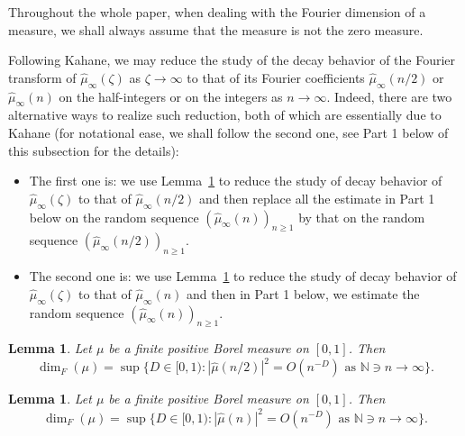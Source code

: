 \documentclass[12pt]{amsart}
\newtheorem{lemma}[theorem]{Lemma}
\theoremstyle{definition}
\theoremstyle{remark}
\newcommand{\N}{\mathbb{N}}
\numberwithin{equation}{section}
\begin{document}
Throughout the whole paper, when dealing with the Fourier dimension of a measure, we shall always assume that the measure is not the zero measure. 


Following Kahane, we may reduce the study of the decay behavior of the Fourier transform of $\widehat{\mu}_\infty(\zeta)$ as $\zeta \to\infty$ to that of its Fourier coefficients $\widehat{\mu}_\infty(n/2)$ or $\widehat{\mu}_\infty(n)$ on the half-integers or on the integers as $n\to\infty$.   Indeed,  there are  two alternative ways to realize such reduction, both of which are essentially due to  Kahane  \cite[Chapter 17, Lemma 1]{Kahane-book} (for notational ease, we shall follow the second one, see Part 1 below of this subsection for the details): 
\begin{itemize}
\item  The first one is:  we use Lemma~\ref{lem-trans-coef-bis} to reduce the study of decay behavior of  $\widehat{\mu}_\infty(\zeta)$  to that of $\widehat{\mu}_\infty(n/2)$ and then  replace all  the estimate in Part 1  below on the random sequence  $(\widehat{\mu}_\infty(n))_{n\ge 1}$ by that on the random sequence  $(\widehat{\mu}_\infty(n/2))_{n\ge 1}$. 
\item The second one is: we use Lemma~\ref{lem-trans-coef} to reduce the study of decay behavior of  $\widehat{\mu}_\infty(\zeta)$  to that of $\widehat{\mu}_\infty(n)$ and then in Part 1 below, we estimate  the random sequence  $(\widehat{\mu}_\infty(n))_{n\ge 1}$. 
\end{itemize}







\begin{lemma}\label{lem-trans-coef-bis}
Let $\mu$ be a finite positive Borel  measure on $[0,1]$.  Then 
\[
\dim_F(\mu)= \sup \Big\{ D \in [0,1):    \text{$|\widehat{\mu}(n/2)|^2  = O(n^{-D})$ as $\N \ni n \to \infty$}    \Big\}. 
\]
\end{lemma}



\begin{lemma}\label{lem-trans-coef}
Let $\mu$ be a  finite positive  Borel  measure on $[0,1]$.  Then 
\[
\dim_F(\mu)= \sup \{ D \in [0,1):    \text{$|\widehat{\mu}(n)|^2  = O(n^{-D})$ as $\N \ni n \to \infty$}    \}. 
\]
\end{lemma}
\end{document}
